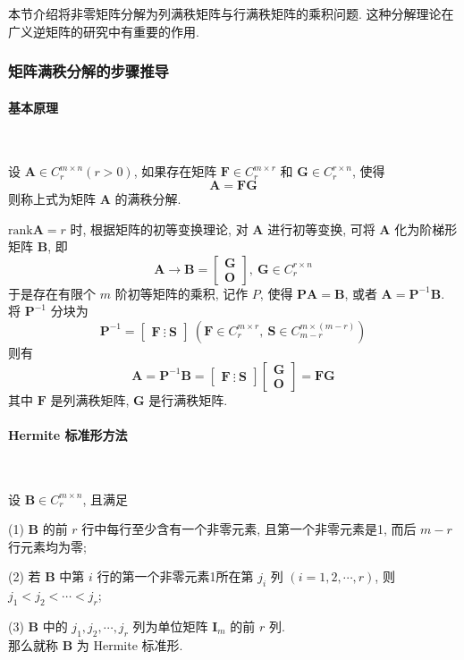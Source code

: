 本节介绍将非零矩阵分解为列满秩矩阵与行满秩矩阵的乘积问题. 这种分解理论在
广义逆矩阵的研究中有重要的作用.

\subsubsection{矩阵满秩分解的步骤推导}

\paragraph[]{基本原理} \

\par 设 $\bm{A} \in C^{m\times n}_r (r > 0)$, 如果存在矩阵 $\bm{F} \in C^{m\times r}_r$ 和 $\bm{G} \in C^{r\times n}_r$, 使得
$$
    \bm{A} = \bm{FG}
$$
则称上式为矩阵 $\bm{A}$ 的满秩分解.

\par $\mathrm{rank}\bm{A} = r$ 时, 根据矩阵的初等变换理论, 对 $\bm{A}$ 进行初等变换, 可将 $\bm{A}$ 化为阶梯形矩阵 $\bm{B}$, 即
$$
    \bm{A} \to \bm{B} = \begin{bmatrix}
        \bm{G} \\
        \bm{O}
    \end{bmatrix}, \ \bm{G} \in C^{r\times n}_r
$$
于是存在有限个 $m$ 阶初等矩阵的乘积, 记作 $P$, 使得 $\bm{PA} = \bm{B}$, 或者 $\bm{A} = \bm{P}^{-1}\bm{B}$. 将 $\bm{P}^{-1}$ 分块为
$$
    \bm{P}^{-1} = \begin{bmatrix}
        \bm{F} \ \vdots\  \bm{S}
    \end{bmatrix}\ (\bm{F} \in C^{m\times r}_r, \ \bm{S} \in C^{m\times(m-r)}_{m-r})
$$
则有
$$
    \bm{A} = \bm{P}^{-1}\bm{B} = \begin{bmatrix}
        \bm{F} \ \vdots\  \bm{S}
    \end{bmatrix}\begin{bmatrix}
        \bm{G} \\
        \bm{O}
    \end{bmatrix} = \bm{FG}
$$
其中 $\bm{F}$ 是列满秩矩阵, $\bm{G}$ 是行满秩矩阵.

\paragraph[]{Hermite 标准形方法} \

\par 设 $\bm{B} \in C^{m\times n}_r$, 且满足
\par (1) $\bm{B}$ 的前 $r$ 行中每行至少含有一个非零元素, 且第一个非零元素是1, 而后 $m-r$ 行元素均为零;
\par (2) 若 $\bm{B}$ 中第 $i$ 行的第一个非零元素1所在第 $j_i$ 列 $(i = 1,2,\cdots, r)$, 则 $j_1 < j_2 < \cdots < j_r$;
\par (3) $\bm{B}$ 中的 $j_1, j_2, \cdots, j_r$ 列为单位矩阵 $\bm{I}_m$ 的前 $r$ 列.
\\ 那么就称 $\bm{B}$ 为 Hermite 标准形.

